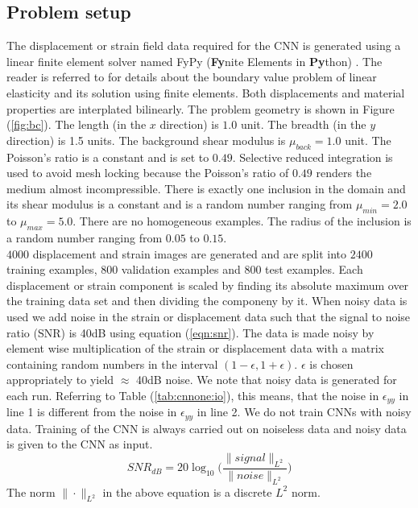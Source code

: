 \documentclass[12pt]{article}
\begin{document}
\subsection{\label{sect:probsetup}Problem setup}
The displacement or strain field data required for the CNN is generated using a linear finite element solver named FyPy (\textbf{Fy}nite Elements in \textbf{Py}thon) \cite{misc:fypy}. The reader is referred to \cite{book:hugheslinear,book:fishbelytschko} for details about the boundary value problem of linear elasticity and its solution using finite elements. Both displacements and material properties are interplated bilinearly. The problem geometry is shown in Figure (\ref{fig:bc}). The length (in the $x$ direction) is $1.0$ unit. The breadth (in the $y$ direction) is 1.5 units. The background shear modulus is $\mu_{back}=1.0$ unit. The Poisson's ratio is a constant and is set to $0.49$. Selective reduced integration is used to avoid mesh locking because the Poisson's ratio of $0.49$ renders the medium almost incompressible. There is exactly one inclusion in the domain and its shear modulus is a constant and is a random number ranging from $\mu_{min}=2.0$ to $\mu_{max}=5.0$. There are no homogeneous examples. The radius of the inclusion is a random number ranging from $0.05$ to $0.15$.\\
$4000$ displacement and strain images are generated and are split into $2400$ training examples, $800$ validation examples and $800$ test examples. Each displacement or strain component is scaled by finding its absolute maximum over the training data set and then dividing the componeny by it. When noisy data is used we add noise in the strain or displacement data such that the signal to noise ratio (SNR) is 40dB using equation (\ref{eqn:snr}). The data is made noisy by element wise multiplication of the strain or displacement data with a matrix containing random numbers in the interval $(1-\epsilon,1+\epsilon)$. $\epsilon$ is chosen appropriately to yield $\approx$ 40dB noise. We note that noisy data is generated for each run. Referring to Table (\ref{tab:cnnone:io}), this means, that the noise in $\epsilon_{yy}$ in line 1 is different from the noise in $\epsilon_{yy}$ in line 2. We do not train CNNs with noisy data. Training of the CNN is always carried out on noiseless data and noisy data is given to the CNN as input. 
\begin{equation}
  \label{eqn:snr}
  SNR_{dB} = 20\log_{10}\Big(\frac{\|signal\|_{L^2}}{\|noise\|_{L^2}}\Big)
\end{equation}
The norm $\|\cdot\|_{L^2}$ in the above equation is a discrete $L^2$ norm. 
\end{document}
